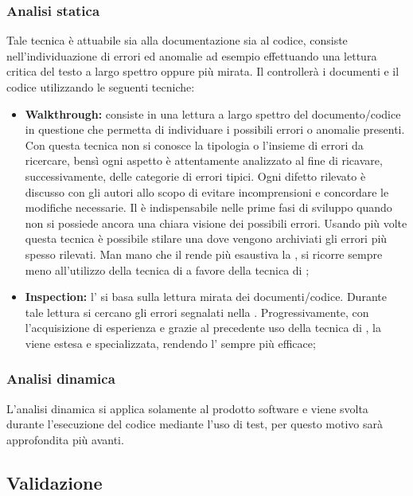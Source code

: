 \documentclass[12pt,a4paper]{article}
\begin{document}
\subsubsection{Analisi statica}
Tale tecnica è attuabile sia alla documentazione sia al codice, consiste nell'individuazione di errori ed anomalie ad esempio effettuando una lettura critica del testo a largo spettro oppure più mirata. Il \VR{} controllerà i documenti e il codice utilizzando le seguenti tecniche:
\begin{itemize}
	\item \textbf{Walkthrough:} consiste in una lettura a largo spettro del documento/codice in questione che permetta di individuare i possibili errori o anomalie presenti. Con questa tecnica non si conosce la tipologia o l'insieme di errori da ricercare, bensì ogni aspetto è attentamente analizzato al fine di ricavare, successivamente, delle categorie di errori tipici. Ogni difetto rilevato è discusso con gli autori allo scopo di evitare incomprensioni e concordare le modifiche necessarie. Il \textit{} è indispensabile nelle prime fasi di sviluppo quando non si possiede ancora una chiara visione dei possibili errori. Usando più volte questa tecnica è possibile stilare una  dove vengono archiviati gli errori più spesso rilevati. Man mano che il \VR{} rende più esaustiva la , si ricorre sempre meno all'utilizzo della tecnica di \textit{} a favore della tecnica di \textit{};
	\item \textbf{Inspection:} l'\textit{} si basa sulla lettura mirata dei documenti/codice. Durante tale lettura si cercano gli errori segnalati nella . Progressivamente, con l'acquisizione di esperienza e grazie al precedente uso della tecnica di \textit{}, la  viene estesa e specializzata, rendendo l'\textit{} sempre più efficace;
\end{itemize}

\subsubsection{Analisi dinamica}
L’analisi dinamica si applica solamente al prodotto software e viene svolta durante l’esecuzione del codice mediante l’uso di test, per questo motivo sarà approfondita più avanti.


\subsection{Validazione}
\end{document}
